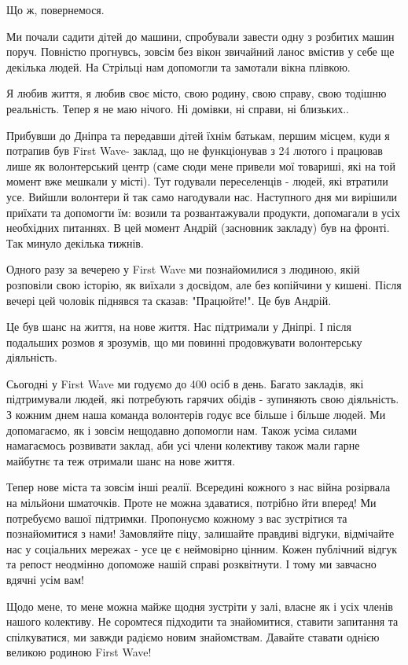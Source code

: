 Що ж, повернемося.  

Ми почали садити дітей до машини, спробували завести одну з розбитих машин
поруч. Повністю прогнувсь, зовсім без вікон звичайний ланос вмістив у себе ще
декілька людей. На Стрільці нам допомогли та замотали вікна плівкою. 

Я любив життя, я любив своє місто, свою родину, свою справу, свою тодішню
реальність. Тепер я не маю нічого. Ні домівки, ні справи, ні близьких.. 

Прибувши до Дніпра та передавши дітей їхнім батькам, першим місцем, куди я
потрапив був First Wave- заклад, що не функціонував з 24 лютого і працював лише
як волонтерський центр (саме сюди мене привели мої товариші, які на той момент
вже мешкали у місті). Тут годували переселенців - людей, які втратили усе.
Вийшли волонтери й так само нагодували нас. Наступного дня ми вирішили приїхати
та допомогти їм: возили та розвантажували продукти, допомагали в усіх
необхідних питаннях. В цей момент Андрій (засновник закладу) був на фронті. Так
минуло декілька тижнів. 

Одного разу за вечерею у First Wave ми познайомилися з людиною, якій розповіли
свою історію, як виїхали з досвідом, але без копійчини у кишені. Після вечері
цей чоловік піднявся та сказав: "Працюйте!". Це був Андрій. 

Це був шанс на життя, на нове життя. Нас підтримали у Дніпрі. І після подальших
розмов я зрозумів, що ми повинні продовжувати волонтерську діяльність. 

Сьогодні у First Wave ми годуємо до 400 осіб в день. Багато закладів, які
підтримували людей, які потребують гарячих обідів - зупиняють свою діяльність.
З кожним днем наша команда волонтерів годує все більше і більше людей. Ми
допомагаємо, як і зовсім нещодавно допомогли нам. Також усіма силами
намагаємось розвивати заклад, аби усі члени колективу також мали гарне майбутнє
та теж отримали шанс на нове життя. 

Тепер нове міста та зовсім інші реалії. Всередині кожного з нас війна розірвала
на мільйони шматочків. Проте не можна здаватися, потрібно йти вперед! Ми
потребуємо вашої підтримки. Пропонуємо кожному з вас зустрітися та
познайомитися з нами! Замовляйте піцу, залишайте правдиві відгуки, відмічайте
нас у соціальних мережах - усе це є неймовірно цінним. Кожен публічний відгук
та репост неодмінно допоможе нашій справі розквітнути. І тому ми завчасно
вдячні усім вам! 

Щодо мене, то мене можна майже щодня зустріти у залі, власне як і усіх членів
нашого колективу. Не соромтеся підходити та знайомитися, ставити запитання та
спілкуватися, ми завжди радіємо новим знайомствам. Давайте ставати однією
великою родиною First Wave!

